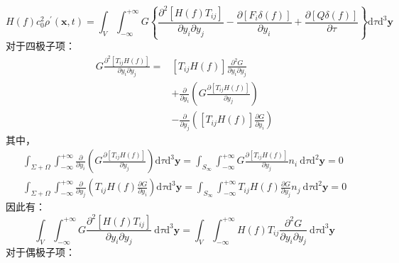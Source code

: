 \begin{enumerate}
\begin{equation}
            H(f) c_{0}^{2} \rho^{\prime}(\mathbf{x}, t)
            =\int_{V} \int_{-\infty}^{+\infty} G\left\{\frac{\partial^{2}\left[H(f) T_{i j}\right]}{\partial y_{i} \partial y_{j}}-\frac{\partial\left[F_{i} \delta(f)\right]}{\partial y_{i}}+\frac{\partial[Q \delta(f)]}{\partial \tau}\right\} \mathrm{d} \tau \mathrm{d}^{3} \mathbf{y}
        \end{equation}
        对于四极子项：
        \begin{equation}
            \begin{aligned}
                G \frac{\partial^{2}\left[T_{i j} H(f)\right]}{\partial y_{i} \partial y_{j}}
                =&\left[T_{i j} H(f)\right] \frac{\partial^{2} G}{\partial y_{i} \partial y_{j}} \\
                &+\frac{\partial}{\partial y_{i}}\left(G \frac{\partial\left[T_{i j} H(f)\right]}{\partial y_{j}}\right) \\
                &-\frac{\partial}{\partial y_{j}}\left(\left[T_{i j} H(f)\right] \frac{\partial G}{\partial y_{i}}\right)
            \end{aligned}
        \end{equation}
        其中，
        \begin{align*}
            \int_{\Sigma+\Omega} \int_{-\infty}^{+\infty} \frac{\partial}{\partial y_{i}}\left(G \frac{\partial\left[T_{i j} H(f)\right]}{\partial y_{j}}\right) \mathrm{d} \tau \mathrm{d}^{3} \mathbf{y}=\int_{S_{\infty}} \int_{-\infty}^{+\infty} G \frac{\partial\left[T_{i j} H(f)\right]}{\partial y_{j}} n_{i} \mathrm{~d} \tau \mathrm{d}^{2} \mathbf{y}=0 \\
            \int_{\Sigma+\Omega} \int_{-\infty}^{+\infty} \frac{\partial}{\partial y_{j}}\left(T_{i j} H(f) \frac{\partial G}{\partial y_{i}}\right) \mathrm{d} \tau \mathrm{d}^{3} \mathbf{y}=\int_{S_{\infty}} \int_{-\infty}^{+\infty} T_{i j} H(f) \frac{\partial G}{\partial y_{j}} n_{j} \mathrm{~d} \tau \mathrm{d}^{2} \mathbf{y}=0
        \end{align*}
        因此有：
        \begin{equation}
            \int_{V} \int_{-\infty}^{+\infty} G \frac{\partial^{2}\left[H(f) T_{i j}\right]}{\partial y_{i} \partial y_{j}} \mathrm{~d} \tau \mathrm{d}^{3} \mathbf{y}=\int_{V} \int_{-\infty}^{+\infty} H(f) T_{i j} \frac{\partial^{2} G}{\partial y_{i} \partial y_{j}} \mathrm{~d} \tau \mathrm{d}^{3} \mathbf{y}
        \end{equation}
        对于偶极子项：
        \begin{equation}

\end{equation}
\end{enumerate}
